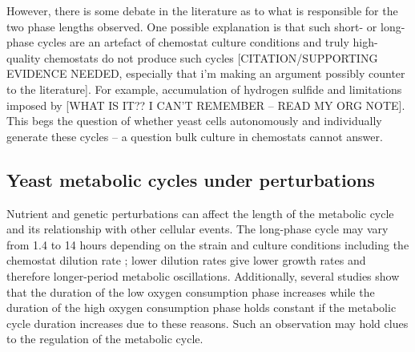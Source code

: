 %
However, there is some debate in the literature as to what is responsible for the two phase lengths observed.
One possible explanation is that such short- or long-phase cycles are an artefact of chemostat culture conditions and truly high-quality chemostats do not produce such cycles [CITATION/SUPPORTING EVIDENCE NEEDED, especially that i'm making an argument possibly counter to the literature].
For example, accumulation of hydrogen sulfide \citep{oneillCircadianRhythmsPersist2011} and limitations imposed by [WHAT IS IT?? I CAN'T REMEMBER -- READ MY ORG NOTE].
This begs the question of whether yeast cells autonomously and individually generate these cycles -- a question bulk culture in chemostats cannot answer.  %

\subsection{Yeast metabolic cycles under perturbations}
\label{subsec:intro-ymc-perturbations}

Nutrient and genetic perturbations can affect the length of the metabolic cycle and its relationship with other cellular events.
The long-phase cycle may vary from 1.4 to 14 hours depending on the strain and culture conditions including the chemostat dilution rate \citep{caustonMetabolicRhythmsFramework2018};
lower dilution rates give lower growth rates and therefore longer-period metabolic oscillations.
Additionally, several studies \citep{slavovCouplingGrowthRate2011,oneillEukaryoticCellBiology2020} show that the duration of the low oxygen consumption phase increases while the duration of the high oxygen consumption phase holds constant if the metabolic cycle duration increases due to these reasons.
Such an observation may hold clues to the regulation of the metabolic cycle.

